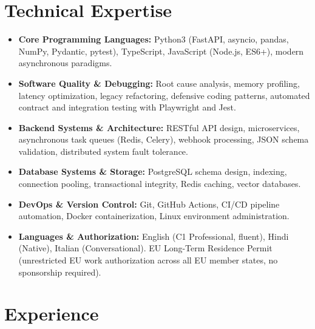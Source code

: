 \documentclass[10pt,a4paper]{article}
\begin{document}
\section{Technical Expertise}
\begin{itemize}
  \item \textbf{Core Programming Languages:} Python3 (FastAPI, asyncio, pandas, NumPy, Pydantic, pytest), TypeScript, JavaScript (Node.js, ES6+), modern asynchronous paradigms.
  \item \textbf{Software Quality \& Debugging:} Root cause analysis, memory profiling, latency optimization, legacy refactoring, defensive coding patterns, automated contract and integration testing with Playwright and Jest.
  \item \textbf{Backend Systems \& Architecture:} RESTful API design, microservices, asynchronous task queues (Redis, Celery), webhook processing, JSON schema validation, distributed system fault tolerance.
  \item \textbf{Database Systems \& Storage:} PostgreSQL schema design, indexing, connection pooling, transactional integrity, Redis caching, vector databases.
  \item \textbf{DevOps \& Version Control:} Git, GitHub Actions, CI/CD pipeline automation, Docker containerization, Linux environment administration.
  \item \textbf{Languages \& Authorization:} English (C1 Professional, fluent), Hindi (Native), Italian (Conversational). EU Long-Term Residence Permit (unrestricted EU work authorization across all EU member states, no sponsorship required).
\end{itemize}

\section{Experience}
\end{document}
